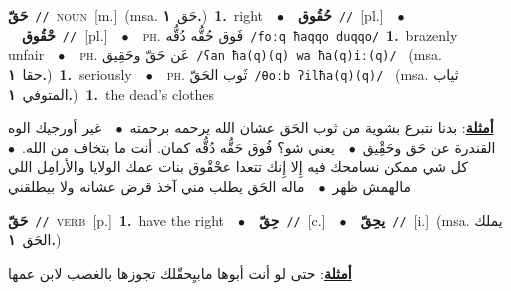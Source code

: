 \documentclass[10pt,a4paper,twoside]{article} %
\begin{document}
\begin{multicols}{2}
{\setlength\topsep{0pt}\textbf{\foreignlanguage{arabic}{حَقّ}}\ {\color{gray}\texttt{//}\color{black}}\ \textsc{noun}\ [m.]\ \color{gray}(msa. \foreignlanguage{arabic}{حَق}~\foreignlanguage{arabic}{\textbf{١.}})\color{black}\ \textbf{1.}~right\ \ $\bullet$\ \ \setlength\topsep{0pt}\textbf{\foreignlanguage{arabic}{حُقُوق}}\ {\color{gray}\texttt{//}\color{black}}\ [pl.]\ \ $\bullet$\ \ \setlength\topsep{0pt}\textbf{\foreignlanguage{arabic}{حْقُوق}}\ {\color{gray}\texttt{//}\color{black}}\ [pl.]\ \ $\bullet$\ \ \textsc{ph.} \color{gray} \foreignlanguage{arabic}{فَوق حُقُّه دُقُّه}\color{black}\ {\color{gray}\texttt{/{\sffamily foːq ħaqqo duqqo}/}\color{black}}\ \textbf{1.}~brazenly unfair\ \ $\bullet$\ \ \textsc{ph.} \color{gray} \foreignlanguage{arabic}{عَن حَقّ وحَقِيق}\color{black}\ {\color{gray}\texttt{/{\sffamily ʕan ħa(q)(q) wa ħa(q)iː(q)}/}\color{black}}\ \color{gray} (msa. \foreignlanguage{arabic}{حقا}~\foreignlanguage{arabic}{\textbf{١.}})\color{black}\ \textbf{1.}~seriously\ \ $\bullet$\ \ \textsc{ph.} \color{gray} \foreignlanguage{arabic}{ثَوب الحَقّ}\color{black}\ {\color{gray}\texttt{/{\sffamily θoːb ʔilħa(q)(q)}/}\color{black}}\ \color{gray} (msa. \foreignlanguage{arabic}{ثياب المتوفي}~\foreignlanguage{arabic}{\textbf{١.}})\color{black}\ \textbf{1.}~the dead's clothes\  \begin{flushright}\color{gray}\foreignlanguage{arabic}{\textbf{\underline{\foreignlanguage{arabic}{أمثلة}}}: بدنا نتبرع بشوية من ثوب الحَق عشان الله يرحمه برحمته\ $\bullet$\ \  غير أورجيك الوه القندرة عن حَق وحَقِْيق\ $\bullet$\ \  يعني شو؟ فُوق حَقُّه دُقُّه كمان. أنت ما بتخاف من الله.\ $\bullet$\ \  كل شي ممكن نسامحك فيه إِلا إِنك تتعدا عحْقْوق بنات عمك الولايا والأرامِل اللي مالهمش ظهر\ $\bullet$\ \  ماله الحَق يطلب مني آخذ قرض عشانه ولا بيطلقني}\end{flushright}\color{black}} \vspace{2mm}

{\setlength\topsep{0pt}\textbf{\foreignlanguage{arabic}{حَقّ}}\ {\color{gray}\texttt{//}\color{black}}\ \textsc{verb}\ [p.]\ \textbf{1.}~have the right\ \ $\bullet$\ \ \setlength\topsep{0pt}\textbf{\foreignlanguage{arabic}{حِقّ}}\ {\color{gray}\texttt{//}\color{black}}\ [c.]\ \ $\bullet$\ \ \setlength\topsep{0pt}\textbf{\foreignlanguage{arabic}{يحِقّ}}\ {\color{gray}\texttt{//}\color{black}}\ [i.]\ \color{gray}(msa. \foreignlanguage{arabic}{يملك الحَق}~\foreignlanguage{arabic}{\textbf{١.}})\color{black}\  \begin{flushright}\color{gray}\foreignlanguage{arabic}{\textbf{\underline{\foreignlanguage{arabic}{أمثلة}}}: حتى لو أنت أبوها مابيِحقّلك تجوزها بالغصب لابن عمها}\end{flushright}\color{black}} \vspace{2mm}


\end{multicols}
\end{document}
